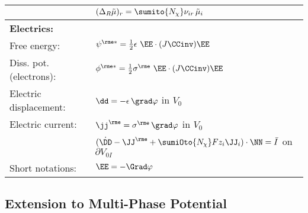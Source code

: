 \begin{table}[H]
\begin{tabular}{| l l |}
    & $(\Delta_R\tilde\mu)_r=\sumito{\Nchi}\nuir\,\tilde\mu_i $  \\
    \hline
    \bf Electrics: & \\
    Free energy: & $\psies = \frac{1}{2}\epsilon \ \EE \cdot (J\CCinv)\EE$ \\
    Diss. pot. (electrons): & $\phies = \frac{1}{2} \sigmae \ \EE \cdot (J\CCinv)\EE$ \\
    Electric displacement: & $\dd = - \epsilon \, \grad\varphi$ \quad in $V_0$\\
    Electric current: & $\jje = \sigmae \, \grad\varphi$ \quad in $V_0$ \\
    & $(\dot\DD-\JJe+\sumiOto{\Nchi}Fz_i\JJ_i)\cdot\NN = \bar I$ \quad on $\partial V_{0I}$\\
    Short notations: & $\EE = -\Grad \varphi$ \\
    \hline
  \end{tabular}
  \label{tab:optCond1}
\end{table}

\newpage

\subsection{Extension to Multi-Phase Potential} %

